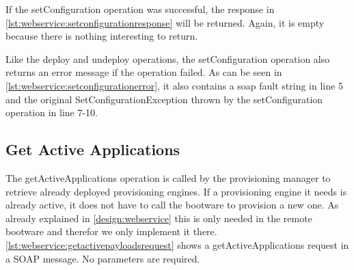 \vspace*{\baselineskip}

If the setConfiguration operation was successful, the response in \autoref{lst:webservice:setconfigurationresponse} will be returned.
Again, it is empty because there is nothing interesting to return.

\vspace*{\baselineskip}

Like the deploy and undeploy operations, the setConfiguration operation also returns an error message if the operation failed.
As can be seen in \autoref{lst:webservice:setconfigurationerror}, it also contains a soap fault string in line 5 and the original SetConfigurationException thrown by the setConfiguration operation in line 7-10.

\vspace*{\baselineskip}

\subsection{Get Active Applications}

The getActiveApplications operation is called by the provisioning manager to retrieve already deployed provisioning engines.
If a provisioning engine it needs is already active, it does not have to call the bootware to provision a new one.
As already explained in \autoref{design:webservice} this is only needed in the remote bootware and therefor we only implement it there.
\autoref{lst:webservice:getactivepayloadsrequest} shows a getActiveApplications request in a SOAP message.
No parameters are required.


